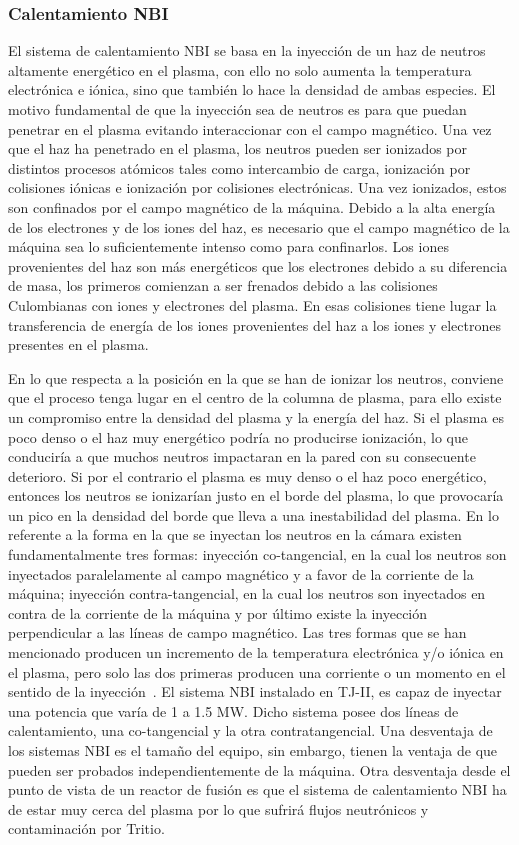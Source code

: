 \subsubsection*{Calentamiento NBI}
El sistema de calentamiento NBI se basa en la inyección de un haz de neutros altamente
energético en el plasma, con ello no solo aumenta la temperatura electrónica e iónica, sino que
también lo hace la densidad de ambas especies. El motivo fundamental de que la inyección
sea de neutros es para que puedan penetrar en el plasma evitando interaccionar con el campo
magnético.
Una vez que el haz ha penetrado en el plasma, los neutros pueden ser ionizados por distintos
procesos atómicos tales como intercambio de carga, ionización por colisiones iónicas e
ionización por colisiones electrónicas. Una vez ionizados, estos son confinados por el campo
magnético de la máquina. Debido a la alta energía de los electrones y de los iones del haz,
es necesario que el campo magnético de la máquina sea lo suficientemente intenso como para
confinarlos.
Los iones provenientes del haz son más energéticos que los electrones debido a su diferencia de
masa, los primeros comienzan a ser frenados debido a las colisiones Culombianas con iones
y electrones del plasma. En esas colisiones tiene lugar la transferencia de energía de los iones
provenientes del haz a los iones y electrones presentes en el plasma.\par
En lo que respecta a la posición en la que se han de ionizar los neutros, conviene que el
proceso tenga lugar en el centro de la columna de plasma, para ello existe un compromiso
entre la densidad del plasma y la energía del haz. Si el plasma es poco denso o el haz muy
energético podría no producirse ionización, lo que conduciría a que muchos neutros impactaran
en la pared con su consecuente deterioro. Si por el contrario el plasma es muy denso
o el haz poco energético, entonces los neutros se ionizarían justo en el borde del plasma, lo
que provocaría un pico en la densidad del borde que lleva a una inestabilidad del plasma.
En lo referente a la forma en la que se inyectan los neutros en la cámara existen fundamentalmente
tres formas: inyección co-tangencial, en la cual los neutros son inyectados paralelamente
al campo magnético y a favor de la corriente de la máquina; inyección contra-tangencial, en
la cual los neutros son inyectados en contra de la corriente de la máquina y por último existe
la inyección perpendicular a las líneas de campo magnético. Las tres formas que se han mencionado
producen un incremento de la temperatura electrónica y/o iónica en el plasma, pero
solo las dos primeras producen una corriente o un momento en el sentido de la inyección~\cite{wesson2004tokamaks}.
El sistema NBI instalado en TJ-II, es capaz de inyectar una potencia que varía de 1 a 1.5
MW. Dicho sistema posee dos líneas de calentamiento, una co-tangencial y la otra contratangencial.
Una desventaja de los sistemas NBI es el tamaño del equipo, sin embargo, tienen la ventaja
de que pueden ser probados independientemente de la máquina. Otra desventaja desde el
punto de vista de un reactor de fusión es que el sistema de calentamiento NBI ha de estar
muy cerca del plasma por lo que sufrirá flujos neutrónicos y contaminación por Tritio.